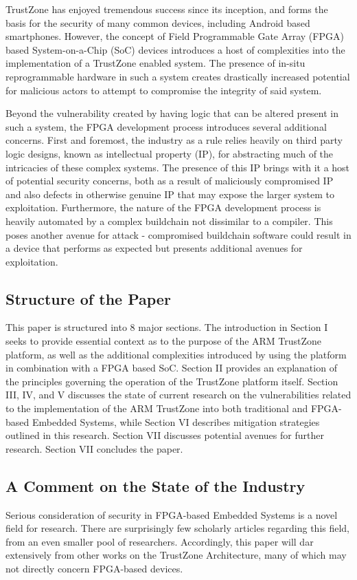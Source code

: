 \documentclass[journal]{IEEEtran}
\begin{document}
TrustZone has enjoyed tremendous success since its inception, and forms the basis for the
security of many common devices, including Android based smartphones. However, the concept
of Field Programmable Gate Array (FPGA) based System-on-a-Chip (SoC) devices introduces a
host of complexities into the implementation of a TrustZone enabled system. The
presence of in-situ reprogrammable hardware in such a system creates drastically increased
potential for malicious actors to attempt to compromise the integrity of said system.

Beyond the vulnerability created by having logic that can be altered present in such a
system, the FPGA development process introduces several additional concerns. First and
foremost, the industry as a rule relies heavily on third party logic designs, known as 
intellectual property (IP), for abstracting much of the intricacies of these complex 
systems. The presence of this IP brings with it a host of potential security concerns,
both as a result of maliciously compromised IP and also defects in otherwise genuine IP 
that may expose the larger system to exploitation. Furthermore, the nature of the FPGA
development process is heavily automated by a complex buildchain not dissimilar to a
compiler. This poses another avenue for attack - compromised buildchain software could
result in a device that performs as expected but presents additional avenues for
exploitation.

\subsection{Structure of the Paper}
This paper is structured into 8 major sections. The introduction in Section I seeks to
provide essential context as to the purpose of the ARM TrustZone platform, as well as the 
additional complexities introduced by using the platform in combination with a FPGA based 
SoC. Section II provides an explanation of the principles governing the operation of the 
TrustZone platform itself. Section III, IV, and V discusses the state of current research on
the vulnerabilities related to the implementation of the ARM TrustZone into both 
traditional and FPGA-based Embedded Systems, while Section VI describes mitigation
strategies outlined in this research. Section VII discusses potential avenues for further 
research. Section VII concludes the paper.

\subsection{A Comment on the State of the Industry}
Serious consideration of security in FPGA-based Embedded Systems is a novel field for
research. There are surprisingly few scholarly articles regarding this field, from an even
smaller pool of researchers. Accordingly, this paper will dar extensively from other works
on the TrustZone Architecture, many of which may not directly concern FPGA-based devices.
\end{document}
